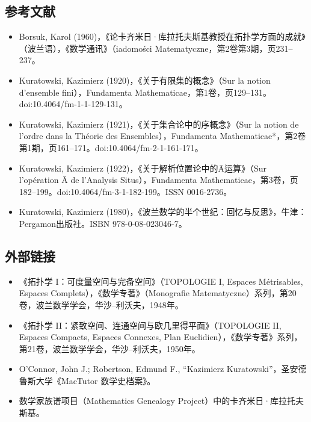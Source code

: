 \subsection{参考文献}
\begin{itemize}
\item Borsuk, Karol (1960)，《论卡齐米日·库拉托夫斯基教授在拓扑学方面的成就》（波兰语），《数学通讯》（iadomości Matematyczne，第2卷第3期，页231–237。
\item Kuratowski, Kazimierz (1920)，《关于有限集的概念》（Sur la notion d'ensemble fini），Fundamenta Mathematicae，第1卷，页129–131。doi:10.4064/fm-1-1-129-131。
\item Kuratowski, Kazimierz (1921)，《关于集合论中的序概念》（Sur la notion de l'ordre dans la Théorie des Ensembles），Fundamenta Mathematicae*，第2卷第1期，页161–171。doi:10.4064/fm-2-1-161-171。
\item Kuratowski, Kazimierz (1922)，《关于解析位置论中的Ā运算》（Sur l'opération Ā de l'Analysis Situs），Fundamenta Mathematicae，第3卷，页182–199。doi:10.4064/fm-3-1-182-199。ISSN 0016-2736。
\item Kuratowski, Kazimierz (1980)，《波兰数学的半个世纪：回忆与反思》，牛津：Pergamon出版社。ISBN 978-0-08-023046-7。
\end{itemize}
\subsection{外部链接}
\begin{itemize}
\item 《拓扑学 I：可度量空间与完备空间》（TOPOLOGIE I, Espaces Métrisables, Espaces Complets），《数学专著》（Monografie Matematyczne）系列，第20卷，波兰数学学会，华沙–利沃夫，1948年。
\item 《拓扑学 II：紧致空间、连通空间与欧几里得平面》（TOPOLOGIE II, Espaces Compacts, Espaces Connexes, Plan Euclidien），《数学专著》系列，第21卷，波兰数学学会，华沙–利沃夫，1950年。
\item O’Connor, John J.; Robertson, Edmund F., “Kazimierz Kuratowski”，圣安德鲁斯大学《MacTutor 数学史档案》。
\item 数学家族谱项目（Mathematics Genealogy Project）中的卡齐米日·库拉托夫斯基。
\end{itemize}